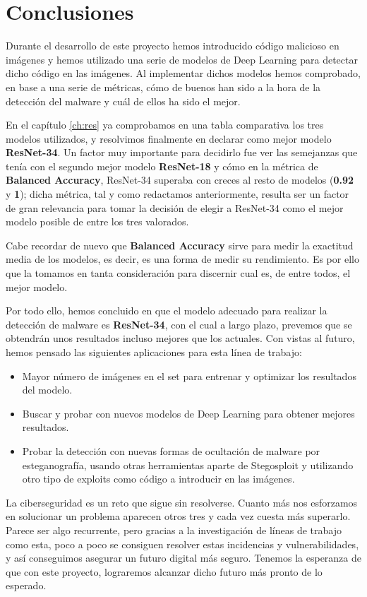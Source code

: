 \chapter{Conclusiones}
\label{ch:conc}

Durante el desarrollo de este proyecto hemos introducido código malicioso en imágenes y hemos utilizado una serie de modelos de Deep Learning para detectar dicho código en las imágenes. Al implementar dichos modelos hemos comprobado, en base a una serie de métricas, cómo de buenos han sido a la hora de la detección del malware y cuál de ellos ha sido el mejor.

En el capítulo \ref{ch:res} ya comprobamos en una tabla comparativa los tres modelos utilizados, y resolvimos finalmente en declarar como mejor modelo \textbf{ResNet-34}. Un factor muy importante para decidirlo fue ver las semejanzas que tenía con el segundo mejor modelo \textbf{ResNet-18} y cómo en la métrica de \textbf{Balanced Accuracy}, ResNet-34 superaba con creces al resto de modelos (\textbf{0.92} y \textbf{1}); dicha métrica, tal y como redactamos anteriormente, resulta ser un factor de gran relevancia para tomar la decisión de elegir a ResNet-34 como el mejor modelo posible de entre los tres valorados.

Cabe recordar de nuevo que \textbf{Balanced Accuracy} sirve para medir la exactitud media de los modelos, es decir, es una forma de medir su rendimiento. Es por ello que la tomamos en tanta consideración para discernir cual es, de entre todos, el mejor modelo.

Por todo ello, hemos concluido en que el modelo adecuado para realizar la detección de malware es \textbf{ResNet-34}, con el cual a largo plazo, prevemos que se obtendrán unos resultados incluso mejores que los actuales. Con vistas al futuro, hemos pensado las siguientes aplicaciones para esta línea de trabajo:

\begin{itemize}
\item Mayor número de imágenes en el set para entrenar y optimizar los resultados del modelo.
\item Buscar y probar con nuevos modelos de Deep Learning para obtener mejores resultados.
\item Probar la detección con nuevas formas de ocultación de malware por esteganografía, usando otras herramientas aparte de Stegosploit y utilizando otro tipo de exploits como código a introducir en las imágenes.
\end{itemize}

La ciberseguridad es un reto que sigue sin resolverse. Cuanto más nos esforzamos en solucionar un problema aparecen otros tres y cada vez cuesta más superarlo. Parece ser algo recurrente, pero gracias a la investigación de líneas de trabajo como esta, poco a poco se consiguen resolver estas incidencias y vulnerabilidades, y así conseguimos asegurar un futuro digital más seguro. Tenemos la esperanza de que con este proyecto, lograremos alcanzar dicho futuro más pronto de lo esperado.
